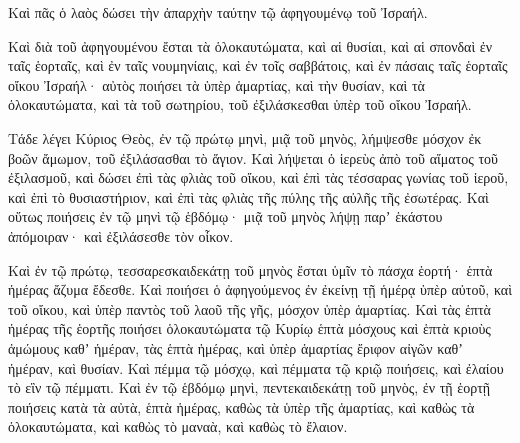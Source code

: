 {Καὶ πᾶς ὁ λαὸς δώσει τὴν ἀπαρχὴν ταύτην τῷ ἀφηγουμένῳ τοῦ Ἰσραήλ.
\par }{\PP {}Καὶ διὰ τοῦ ἀφηγουμένου ἔσται τὰ ὁλοκαυτώματα, καὶ αἱ θυσίαι, καὶ αἱ σπονδαὶ ἐν ταῖς ἑορταῖς, καὶ ἐν ταῖς νουμηνίαις, καὶ ἐν τοῖς σαββάτοις, καὶ ἐν πάσαις ταῖς ἑορταῖς οἴκου Ἰσραήλ· αὐτὸς ποιήσει τὰ ὑπὲρ ἁμαρτίας, καὶ τὴν θυσίαν, καὶ τὰ ὁλοκαυτώματα, καὶ τὰ τοῦ σωτηρίου, τοῦ ἐξιλάσκεσθαι ὑπὲρ τοῦ οἴκου Ἰσραήλ.
\par }{\PP {}Τάδε λέγει Κύριος Θεὸς, ἐν τῷ πρώτῳ μηνὶ, μιᾷ τοῦ μηνὸς, λήμψεσθε μόσχον ἐκ βοῶν ἄμωμον, τοῦ ἐξιλάσασθαι τὸ ἅγιον.
Καὶ λήψεται ὁ ἱερεὺς ἀπὸ τοῦ αἵματος τοῦ ἐξιλασμοῦ, καὶ δώσει ἐπὶ τὰς φλιὰς τοῦ οἴκου, καὶ ἐπὶ τὰς τέσσαρας γωνίας τοῦ ἱεροῦ, καὶ ἐπὶ τὸ θυσιαστήριον, καὶ ἐπὶ τὰς φλιὰς τῆς πύλης τῆς αὐλῆς τῆς ἐσωτέρας.
Καὶ οὕτως ποιήσεις ἐν τῷ μηνὶ τῷ ἑβδόμῳ· μιᾷ τοῦ μηνὸς λήψῃ παρʼ ἑκάστου ἀπόμοιραν· καὶ ἐξιλάσεσθε τὸν οἶκον.
\par }{\PP {}Καὶ ἐν τῷ πρώτῳ, τεσσαρεσκαιδεκάτῃ τοῦ μηνὸς ἔσται ὑμῖν τὸ πάσχα ἑορτή· ἑπτὰ ἡμέρας ἄζυμα ἔδεσθε.
Καὶ ποιήσει ὁ ἀφηγούμενος ἐν ἐκείνῃ τῇ ἡμέρᾳ ὑπὲρ αὐτοῦ, καὶ τοῦ οἴκου, καὶ ὑπὲρ παντὸς τοῦ λαοῦ τῆς γῆς, μόσχον ὑπὲρ ἁμαρτίας.
Καὶ τὰς ἑπτὰ ἡμέρας τῆς ἑορτῆς ποιήσει ὁλοκαυτώματα τῷ Κυρίῳ ἑπτὰ μόσχους καὶ ἑπτὰ κριοὺς ἀμώμους καθʼ ἡμέραν, τὰς ἑπτὰ ἡμέρας, καὶ ὑπὲρ ἁμαρτίας ἔριφον αἰγῶν καθʼ ἡμέραν, καὶ θυσίαν.
Καὶ πέμμα τῷ μόσχῳ, καὶ πέμματα τῷ κριῷ ποιήσεις, καὶ ἐλαίου τὸ εἳν τῷ πέμματι.
Καὶ ἐν τῷ ἑβδόμῳ μηνὶ, πεντεκαιδεκάτῃ τοῦ μηνὸς, ἐν τῇ ἑορτῇ ποιήσεις κατὰ τὰ αὐτὰ, ἑπτὰ ἡμέρας, καθὼς τὰ ὑπὲρ τῆς ἁμαρτίας, καὶ καθὼς τὰ ὁλοκαυτώματα, καὶ καθὼς τὸ μαναὰ, καὶ καθὼς τὸ ἔλαιον.

}
